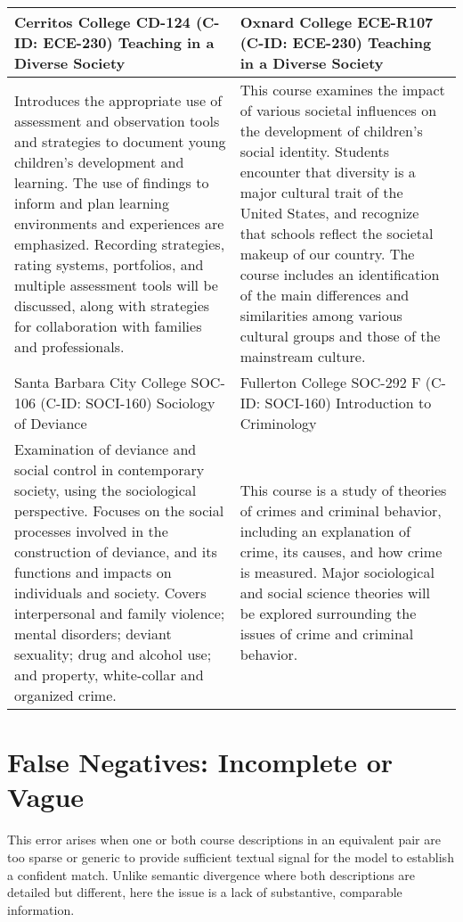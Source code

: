 \begin{longtable}{ >{\baselineskip=12pt}p{}  >{\baselineskip=12pt}p{} }
\bottomrule\toprule
Cerritos College \newline CD-124 (C-ID: ECE-230) \newline Teaching in a Diverse Society & Oxnard College \newline ECE-R107 (C-ID: ECE-230) \newline Teaching in a Diverse Society \\
\midrule
Introduces the appropriate use of assessment and observation tools and strategies to document young children’s development and learning. The use of findings to inform and plan learning environments and experiences are emphasized. Recording strategies, rating systems, portfolios, and multiple assessment tools will be discussed, along with strategies for collaboration with families and professionals. & This course examines the impact of various societal influences on the development of children's social identity. Students encounter that diversity is a major cultural trait of the United States, and recognize that schools reflect the societal makeup of our country. The course includes an identification of the main differences and similarities among various cultural groups and those of the mainstream culture. \\
\bottomrule\toprule
Santa Barbara City College \newline SOC-106 (C-ID: SOCI-160) \newline Sociology of Deviance & Fullerton College \newline SOC-292 F (C-ID: SOCI-160) \newline Introduction to Criminology \\
\midrule
Examination of deviance and social control in contemporary society, using the sociological perspective. Focuses on the social processes involved in the construction of deviance, and its functions and impacts on individuals and society. Covers interpersonal and family violence; mental disorders; deviant sexuality; drug and alcohol use; and property, white-collar and organized crime. & This course is a study of theories of crimes and criminal behavior, including an explanation of crime, its causes, and how crime is measured. Major sociological and social science theories will be explored surrounding the issues of crime and criminal behavior. \\
\bottomrule\toprule
\end{longtable}

\section{False Negatives: Incomplete or Vague}\label{app:fnvague}
This error arises when one or both course descriptions in an equivalent pair are too sparse or generic to provide sufficient textual signal for the model to establish a confident match. Unlike semantic divergence where both descriptions are detailed but different, here the issue is a lack of substantive, comparable information.

